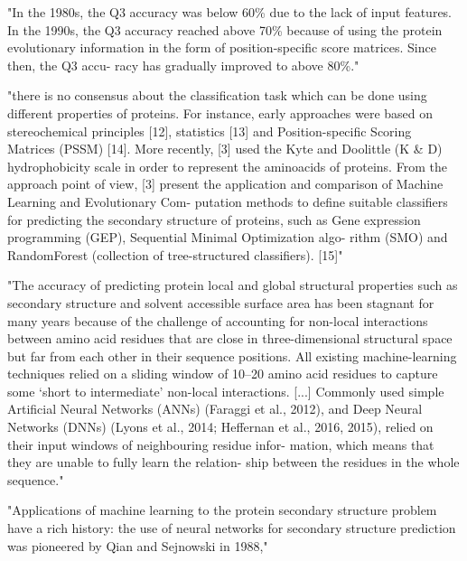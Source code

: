 \documentclass[]{scrartcl}
\begin{document}
"In the 1980s, the Q3 accuracy was below 60\% due to the lack of input features. In the 1990s, the Q3 accuracy reached above 70\% because of using the protein evolutionary information in the form of position-specific score matrices. Since then, the Q3 accu- racy has gradually improved to above 80\%." \cite{Fang2017}

"there is no consensus about the classification task which can be done using different properties of proteins. For instance, early approaches were based on stereochemical principles [12], statistics [13] and Position-specific Scoring Matrices (PSSM) [14]. More recently, [3] used the Kyte and Doolittle (K \& D) hydrophobicity scale in order to represent the aminoacids of proteins. From the approach point of view, [3] present the application and comparison of Machine Learning and Evolutionary Com- putation methods to define suitable classifiers for predicting the secondary structure of proteins, such as Gene expression programming (GEP), Sequential Minimal Optimization algo- rithm (SMO) and RandomForest (collection of tree-structured classifiers). [15]" \cite{Hattori2017}

"The accuracy of predicting protein local and global structural properties such as secondary structure and solvent accessible surface area has been stagnant for many years because of the challenge of accounting for non-local interactions between amino acid residues that are close in three-dimensional structural space but far from each other in their sequence positions. All existing machine-learning techniques relied on a sliding window of 10–20 amino acid residues to capture some ‘short to intermediate’ non-local interactions. [...] Commonly used simple Artificial Neural Networks (ANNs) (Faraggi et al., 2012), and Deep Neural Networks (DNNs) (Lyons et al., 2014; Heffernan et al., 2016, 2015), relied on their input windows of neighbouring residue infor- mation, which means that they are unable to fully learn the relation- ship between the residues in the whole sequence." \cite{Heffernan2017}

"Applications of machine learning to the protein secondary structure problem have a rich history: the use of neural networks for secondary structure prediction was pioneered by Qian and Sejnowski in 1988," \cite{Busia2017}
\end{document}
